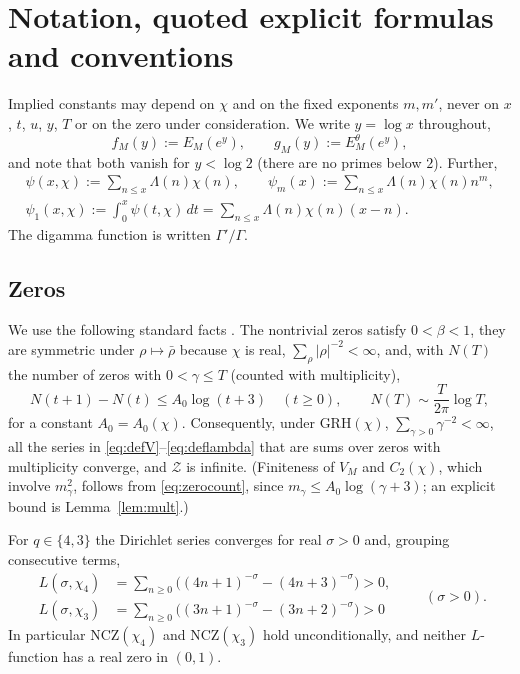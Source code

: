 \documentclass[11pt]{amsart}
\theoremstyle{definition}
\numberwithin{equation}{section}
\newcommand{\cZ}{\mathcal Z}          %
\newcommand{\Ein}{E^{\theta}}
\begin{document}
\section{Notation, quoted explicit formulas and conventions}
\label{sec:prelim}

Implied constants may depend on $\chi$ and on the fixed exponents
$m,m'$, never on $x$, $t$, $u$, $y$, $T$ or on the zero under
consideration. We write $y=\log x$ throughout,
\[
f_M(y):=E_M(e^y),\qquad g_M(y):=\Ein_M(e^y),
\]
and note that both vanish for $y<\log2$ (there are no primes below
$2$). Further,
\begin{gather*}
\psi(x,\chi):=\sum_{n\le x}\Lambda(n)\chi(n),\qquad
\psi_m(x):=\sum_{n\le x}\Lambda(n)\chi(n)n^m,\\
\psi_1(x,\chi):=\int_0^x\psi(t,\chi)\,dt
=\sum_{n\le x}\Lambda(n)\chi(n)(x-n).
\end{gather*}
The digamma function is written $\Gamma'/\Gamma$.

\subsection{Zeros}\label{subsec:zeros}
We use the following standard facts \cite[\S\S12, 16]{Dav00}. The
nontrivial zeros satisfy $0<\beta<1$, they are symmetric under
$\rho\mapsto\bar\rho$ because $\chi$ is real, $\sum_\rho|\rho|^{-2}
<\infty$, and, with $N(T)$ the number of zeros with $0<\gamma\le T$
(counted with multiplicity),
\begin{equation}\label{eq:zerocount}
N(t+1)-N(t)\le A_0\log(t+3)\quad(t\ge0),\qquad
N(T)\sim\frac{T}{2\pi}\log T ,
\end{equation}
for a constant $A_0=A_0(\chi)$. Consequently, under GRH$(\chi)$,
$\sum_{\gamma>0}\gamma^{-2}<\infty$, all the series in
\eqref{eq:defV}--\eqref{eq:deflambda} that are sums over zeros with
multiplicity converge, and $\cZ$ is infinite. (Finiteness of $V_M$
and $C_2(\chi)$, which involve $m_\gamma^2$, follows from
\eqref{eq:zerocount}, since $m_\gamma\le A_0\log(\gamma+3)$; an
explicit bound is Lemma~\ref{lem:mult}.)

For $q\in\{4,3\}$ the Dirichlet series converges for real $\sigma>0$
and, grouping consecutive terms,
\begin{equation}\label{eq:Lpositive}
\begin{aligned}
L(\sigma,\chi_4)&=\sum_{n\ge0}\bigl((4n+1)^{-\sigma}-(4n+3)^{-\sigma}\bigr)>0,\\
L(\sigma,\chi_3)&=\sum_{n\ge0}\bigl((3n+1)^{-\sigma}-(3n+2)^{-\sigma}\bigr)>0
\end{aligned}
\qquad(\sigma>0).
\end{equation}
In particular NCZ$(\chi_4)$ and NCZ$(\chi_3)$ hold unconditionally,
and neither $L$-function has a real zero in $(0,1)$.
\end{document}
